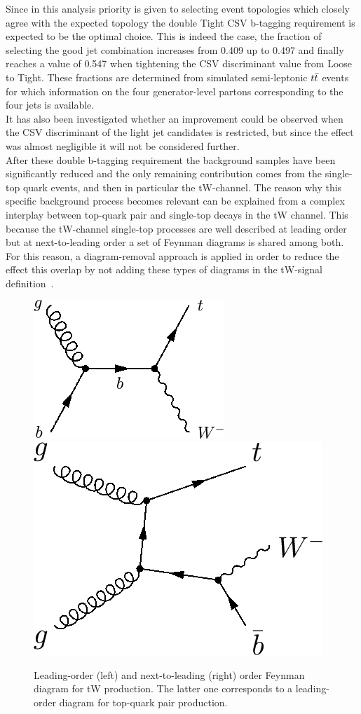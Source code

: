 Since in this analysis priority is given to selecting event topologies which closely agree with the expected topology the double Tight CSV b-tagging requirement is expected to be the optimal choice.
This is indeed the case, the fraction of selecting the good jet combination increases from 0.409 up to 0.497 and finally reaches a value of 0.547 when tightening the CSV discriminant value from Loose to Tight. 
These fractions are determined from simulated semi-leptonic $t\bar{t}$ events for which information on the four generator-level partons corresponding to the four jets is available.
\\
It has also been investigated whether an improvement could be observed when the CSV discriminant of the light jet candidates is restricted, but since the effect was almost negligible it will not be considered further.
\\

After these double b-tagging requirement the background samples have been significantly reduced and the only remaining contribution comes from the single-top quark events, and then in particular the tW-channel.
The reason why this specific background process becomes relevant can be explained from a complex interplay between top-quark pair and single-top decays in the tW channel. This because the tW-channel single-top processes are well described at leading order but at next-to-leading order a set of Feynman diagrams is shared among both.
For this reason, a diagram-removal approach is applied in order to reduce the effect this overlap by not adding these types of diagrams in the tW-signal definition~\cite{DRST}.
\begin{figure}[h!t]
 \centering
 \includegraphics[width = 0.3 \textwidth]{Chapters/Chapter4_EvtSel/Figures/STtW_LO.png} \hspace{0.5cm}
 \includegraphics[width = 0.3 \textwidth]{Chapters/Chapter4_EvtSel/Figures/STtW_NLO.png}
 \caption{Leading-order (left) and next-to-leading (right) order Feynman diagram for tW production. The latter one corresponds to a leading-order diagram for top-quark pair production.} \label{fig::STtW}
\end{figure}

